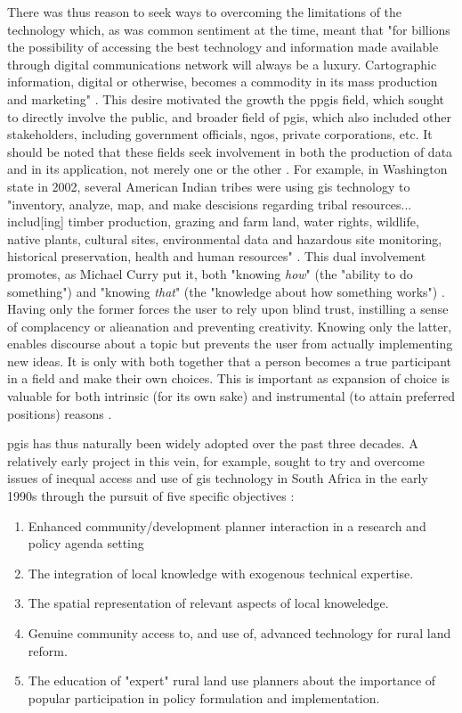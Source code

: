 There was thus reason to seek ways to overcoming the limitations of the technology which, as was common sentiment at the time, meant that "for billions the possibility of accessing the best technology and information made available through digital communications network will always be a luxury. Cartographic information, digital or otherwise, becomes a commodity in its mass production and marketing" \cite{mchaffieManufacturingMetaphors1994}. This desire motivated the growth the \ac{ppgis} field, which sought to directly involve the public, and broader field of \ac{pgis}, which also included other stakeholders, including government officials, \acp{ngo}, private corporations, etc. It should be noted that these fields seek involvement in both the production of data and in its application, not merely one or the other \cite{weinerParticipatoryGeographicInformation2007}. For example, in Washington state in 2002, several American Indian tribes were using \ac{gis} technology to "inventory, analyze, map, and make descisions regarding tribal resources... includ[ing] timber production, grazing and farm land, water rights, wildlife, native plants, cultural sites, environmental data and hazardous site monitoring, historical preservation, health and human resources" \cite{bondCherokeeNationTribal2002}. This dual involvement promotes, as Michael Curry put it, both "knowing \textit{how}" (the "ability to do something") and "knowing \textit{that}" (the "knowledge about how something works") \cite{curryGeographicalInformationSystems1994}. Having only the former forces the user to rely upon blind trust, instilling a sense of complacency or alieanation and preventing creativity. Knowing only the latter, enables discourse about a topic but prevents the user from actually implementing new ideas. It is only with both together that a person becomes a true participant in a field and make their own choices. This is important as expansion of choice is valuable for both intrinsic (for its own sake) and instrumental (to attain preferred positions) reasons \cite{senFreedomChoiceConcept1988}.

\ac{pgis} has thus naturally been widely adopted over the past three decades. A relatively early project in this vein, for example, sought to try and overcome issues of inequal access and use of \ac{gis} technology in South Africa in the early 1990s through the pursuit of five specific objectives \cite{harrisPursuingSocialGoals1994}: 

\begin{enumerate}[itemsep=0pt,parsep=0pt]
	\item{Enhanced community/development planner interaction in a research and policy agenda setting}
	\item{The integration of local knowledge with exogenous technical expertise.}
	\item{The spatial representation of relevant aspects of local knoweledge.}
	\item{Genuine community access to, and use of, advanced technology for rural land reform.}
	\item{The education of "expert" rural land use planners about the importance of popular participation in policy formulation and implementation.}
\end{enumerate}

